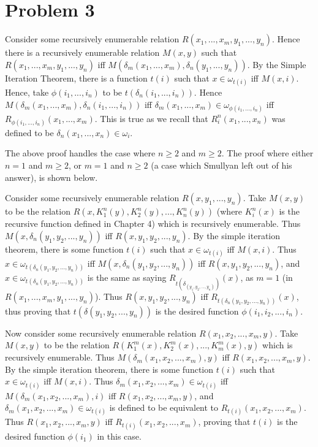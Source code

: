 \documentclass{article}
\theoremstyle{definition}
\begin{document}
\section*{Problem 3}
Consider some recursively enumerable relation $R\left(x_1,...,x_m,y_1,...,y_n\right)$. Hence there is a recursively enumerable relation $M(x,y)$ such that 
$R(x_1,...,x_m,y_1,...,y_n)$ iff $M\left(\delta_m\left(x_1,...,x_m\right),\delta_n\left(y_1,...,y_n\right)\right)$. By the Simple Iteration Theorem, there is a function 
$t(i)$ such that $x\in\omega_{t(i)}$ iff $M(x,i)$. Hence, take 
$\phi(i_1,...,i_n)$ to be $t(\delta_n(i_1,...,i_n))$. Hence $M(\delta_m(x_1,...,x_m),\delta_n(i_1,...,i_n))$ iff $\delta_m(x_1,...,x_m)\in \omega_{\phi(i_1,...,i_n)}$ iff
$R_{\phi(i_1,...,i_n)}(x_1,...,x_m)$. This is true as we recall that $R^n_i(x_1,...,x_n)$ was defined to be $\delta_n(x_1,...,x_n)\in\omega_i$. 


The above proof handles the case where $n\ge 2$ and $m\ge 2$. The proof where either $n=1$ and $m\ge 2$, or $m=1$ and $n\ge 2$ (a case which Smullyan left out of his 
answer), is shown below.


Consider some recursively enumerable relation $R(x,y_1,...,y_n)$. Take $M(x,y)$ to be the relation $R(x,K^n_1(y),K^n_2(y),...,K^n_n(y))$ (where $K^n_i(x)$ is the recursive 
function defined in Chapter 4) which is recursively enumerable. Thus $M(x,\delta_n(y_1,y_2,...,y_n))$ iff $R(x,y_1,y_2,...,y_n)$. By the simple iteration theorem, there is some function 
$t(i)$ such that $x\in\omega_{t(i)}$ iff $M(x,i)$. Thus $x\in\omega_{t(\delta_n(y_1,y_2,...,y_n))}$ iff $M(x,\delta_n(y_1,y_2,...,y_n))$ iff $R(x,y_1,y_2,...,y_n)$, and 
$x\in\omega_{t(\delta_n(y_1,y_2,...,y_n))}$ is the same as saying
$R_{t(\delta_(y_1,y_2,...,y_n))}(x)$, as $m=1$ (in $R(x_1,...,x_m,y_1,...,y_n)$). Thus $R(x,y_1,y_2,...,y_n)$ iff $R_{t(\delta_n(y_1,y_2,...,y_n))}(x)$, thus proving that 
$t(\delta(y_1,y_2,...,y_n))$ is the desired function $\phi(i_1,i_2,...,i_n)$.


Now consider some recursively enumerable relation $R(x_1,x_2,...,x_m,y)$. Take $M(x,y)$ to be the relation $R(K^m_1(x),K^m_2(x),...,K^m_m(x),y)$ which is recursively enumerable. Thus 
$M(\delta_m(x_1,x_2,...,x_m),y)$ iff $R(x_1,x_2,...,x_m,y)$. By the simple iteration theorem, there is some function $t(i)$ such that $x\in\omega_{t(i)}$ iff $M(x,i)$. Thus 
$\delta_m(x_1,x_2,...,x_m)\in\omega_{t(i)}$ iff $M(\delta_m(x_1,x_2,...,x_m),i)$ iff $R(x_1,x_2,...,x_m,y)$, and $\delta_m(x_1,x_2,...,x_m)\in\omega_{t(i)}$ is defined to be equivalent to 
$R_{t(i)}(x_1,x_2,...,x_m)$. Thus $R(x_1,x_2,...,x_m,y)$ iff $R_{t(i)}(x_1,x_2,...,x_m)$, proving that $t(i)$ is the desired function $\phi(i_1)$ in this case.
\end{document}
